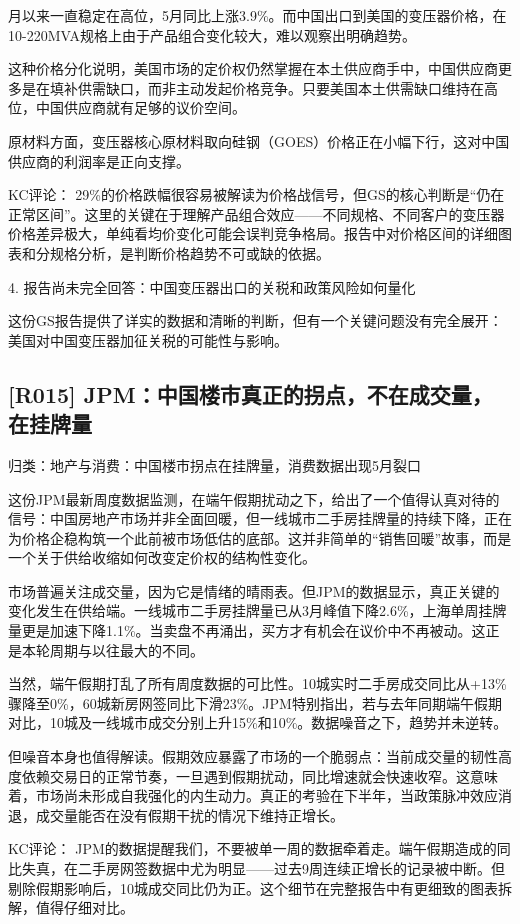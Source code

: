 \documentclass[11pt]{ctexart}
\begin{document}
月以来一直稳定在高位，5月同比上涨3.9\%。而中国出口到美国的变压器价格，在10-220MVA规格上由于产品组合变化较大，难以观察出明确趋势。

这种价格分化说明，美国市场的定价权仍然掌握在本土供应商手中，中国供应商更多是在填补供需缺口，而非主动发起价格竞争。只要美国本土供需缺口维持在高位，中国供应商就有足够的议价空间。

原材料方面，变压器核心原材料取向硅钢（GOES）价格正在小幅下行，这对中国供应商的利润率是正向支撑。

KC评论： 29\%的价格跌幅很容易被解读为价格战信号，但GS的核心判断是“仍在正常区间”。这里的关键在于理解产品组合效应——不同规格、不同客户的变压器价格差异极大，单纯看均价变化可能会误判竞争格局。报告中对价格区间的详细图表和分规格分析，是判断价格趋势不可或缺的依据。

4. 报告尚未完全回答：中国变压器出口的关税和政策风险如何量化

这份GS报告提供了详实的数据和清晰的判断，但有一个关键问题没有完全展开：美国对中国变压器加征关税的可能性与影响。

\subsection{[R015] JPM：中国楼市真正的拐点，不在成交量，在挂牌量}
{\small\color{refgray}归类：地产与消费：中国楼市拐点在挂牌量，消费数据出现5月裂口}

这份JPM最新周度数据监测，在端午假期扰动之下，给出了一个值得认真对待的信号：中国房地产市场并非全面回暖，但一线城市二手房挂牌量的持续下降，正在为价格企稳构筑一个此前被市场低估的底部。这并非简单的“销售回暖”故事，而是一个关于供给收缩如何改变定价权的结构性变化。

市场普遍关注成交量，因为它是情绪的晴雨表。但JPM的数据显示，真正关键的变化发生在供给端。一线城市二手房挂牌量已从3月峰值下降2.6\%，上海单周挂牌量更是加速下降1.1\%。当卖盘不再涌出，买方才有机会在议价中不再被动。这正是本轮周期与以往最大的不同。

当然，端午假期打乱了所有周度数据的可比性。10城实时二手房成交同比从+13\%骤降至0\%，60城新房网签同比下滑23\%。JPM特别指出，若与去年同期端午假期对比，10城及一线城市成交分别上升15\%和10\%。数据噪音之下，趋势并未逆转。

但噪音本身也值得解读。假期效应暴露了市场的一个脆弱点：当前成交量的韧性高度依赖交易日的正常节奏，一旦遇到假期扰动，同比增速就会快速收窄。这意味着，市场尚未形成自我强化的内生动力。真正的考验在下半年，当政策脉冲效应消退，成交量能否在没有假期干扰的情况下维持正增长。

KC评论： JPM的数据提醒我们，不要被单一周的数据牵着走。端午假期造成的同比失真，在二手房网签数据中尤为明显——过去9周连续正增长的记录被中断。但剔除假期影响后，10城成交同比仍为正。这个细节在完整报告中有更细致的图表拆解，值得仔细对比。
\end{document}
